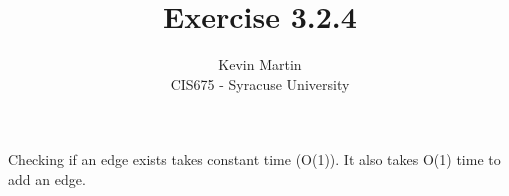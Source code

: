 \documentclass{article}
\author{Kevin Martin\\ CIS675 - Syracuse University}
\title{Exercise 3.2.4}
\begin{document}
\maketitle
Checking if an edge exists takes constant time (O(1)). It also takes O(1) time to add an edge.
\end{document}
